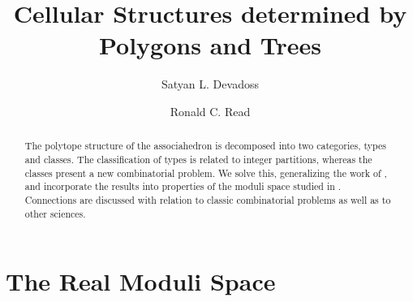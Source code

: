 \documentclass[10pt]{amsart}
\begin{document}
\theoremstyle{plain}
\newtheorem{thm}{Theorem}[subsection]
\newtheorem{prop}[thm]{Proposition}
\newtheorem{cor}[thm]{Corollary}
\newtheorem{lem}[thm]{Lemma}
\newtheorem{conj}[thm]{Conjecture}

\theoremstyle{definition}
\newtheorem{defn}[thm]{Definition}
\newtheorem{exmp}[thm]{Example}

\theoremstyle{remark}
\newtheorem*{rem}{Remark}
\newtheorem*{hnote}{Historical Note}
\newtheorem*{nota}{Notation}
\newtheorem*{ack}{Acknowledgments}


\title {Cellular Structures determined by Polygons and Trees}

\author{Satyan L. Devadoss}
\author{Ronald C. Read}

\address{Department of Mathematics, Ohio State University, Columbus, Ohio}
\address{Department of Combinatorics and Optimization, University of Waterloo, Canada}

\begin{abstract}
The polytope structure of the associahedron is decomposed into two categories, types and classes.  The classification of types is related to integer partitions, whereas the classes present a new combinatorial problem.  We solve this, generalizing the work of \cite{r1}, and incorporate the results into properties of the moduli space  studied in \cite{dev}.  Connections are discussed with relation to classic combinatorial problems as well as to other sciences.
\end{abstract}

\maketitle

\baselineskip=15pt

\vspace{-.1in}

%
%

\section {The Real Moduli Space}
\end{document}
